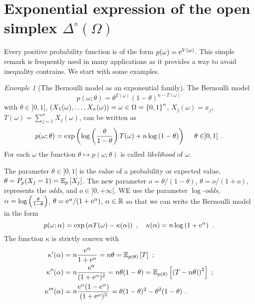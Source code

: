 \documentclass[12pt,a4paper]{amsart}
\theoremstyle{plain}%
\theoremstyle{definition}
\theoremstyle{remark}
\newtheorem{example}{Example}
\begin{document}
\section{Exponential expression of the open simplex $\Delta^\circ(\Omega)$}
\label{sec:expon-expr-delt}

Every positive probability function is of the form $p(\omega) = \mathrm{e}^{V(\omega)}$. This simple remark is frequently used in many applications as it provides a way to avoid inequality contrains. We start with some examples.

\begin{example}[The Bernoulli model as an exponential family]
  The Bernoulli model
  \begin{equation*}
 p(\omega;\theta) = \theta^{T(\omega)} (1-\theta)^{n-T(\omega)}
\end{equation*}
with $\theta \in ]0,1[$, $(X_1(\omega),\dots,X_n(\omega)) = \omega \in \Omega = \left\{0,1\right\}^n$, $X_j(\omega) = x_j$, $T(\omega) = \sum_{j=1}^n X_j(\omega)$, can be written as
    \begin{equation*}
      p(\omega;\theta) = \expof{\logof{\frac{\theta}{1-\theta}}T(\omega) + n\logof{1-\theta}} \ \quad \theta \in ]0,1[ \ .
    \end{equation*}
    For each $\omega$ the function $\theta \mapsto p(\omega;\theta)$ is called \emph{likelihood} of $\omega$.

The parameter $\theta \in ]0,1[$ is the value of a probability or expected value, $\theta = P_p(X_j=1) = \operatorname{\mathbb E}_{p}\left[X_j\right]$. The new parameter $o = \theta/(1-\theta)$, $\theta = o/(1+o)$, represents the \emph{odds}, and $o \in ]0,+\infty[$. WE use the parameter \emph{$\log$-odds}, $\alpha = \log\left(\frac{\theta}{1-\theta}\right)$, $\theta = \mathrm{e}^\alpha/(1+\mathrm{e}^\alpha)$, $\alpha \in \mathbb{R}$ so that we can write the Bernoulli model in the form
  \begin{equation*}
    p(\omega;\alpha) = \expof{\alpha T(\omega) - \kappa(\alpha)} \ , \quad \kappa(\alpha) = n \logof{1+\euler^\alpha} \ .
  \end{equation*}
The function $\kappa$ is strictly convex with
\begin{align*}
  \kappa'(\alpha) &= n\frac{\euler^\alpha}{1+\euler^\alpha} = n\theta = \expectat {p(\theta)} T \ ;\\
  \kappa''(\alpha) &= n\frac{\euler^\alpha}{(1+\euler^\alpha)^2} = n\theta(1-\theta) = \expectat {p(\theta)} {\left(T-n\theta)\right)^2} \ ; \\
  \kappa'''(\alpha) &= n \frac{\euler^\alpha(1-\euler^\alpha)}{(1+\euler^\alpha)^3} = \theta(1-\theta)^2 - \theta^2(1-\theta) \ .
\end{align*}


\end{example}
\end{document}
